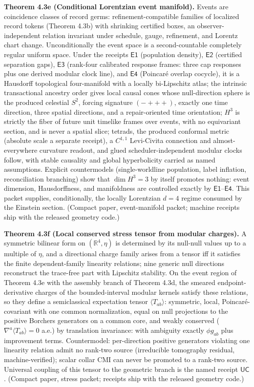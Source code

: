 \textbf{Theorem 4.3e (Conditional Lorentzian event manifold).} Events are coincidence classes of record germs: refinement-compatible families of localized record tokens (Theorem 4.3b) with shrinking certified boxes, an observer-independent relation invariant under schedule, gauge, refinement, and Lorentz chart change. Unconditionally the event space is a second-countable completely regular uniform space. Under the receipts \(\mathsf{E1}\) (population density), \(\mathsf{E2}\) (certified separation gaps), \(\mathsf{E3}\) (rank-four calibrated response frames: three cap responses plus one derived modular clock line), and \(\mathsf{E4}\) (Poincar\'e overlap cocycle), it is a Hausdorff topological four-manifold with a locally bi-Lipschitz atlas; the intrinsic transactional ancestry order gives local causal cones whose null-direction sphere is the produced celestial \(S^2\), forcing signature \((-{+}{+}{+})\), exactly one time direction, three spatial directions, and a repair-oriented time orientation; \(H^3\) is strictly the fiber of future unit timelike frames over events, with no equivariant section, and is never a spatial slice; tetrads, the produced conformal metric (absolute scale a separate receipt), a \(C^{1,1}\) Levi-Civita connection and almost-everywhere curvature readout, and glued scheduler-independent modular clocks follow, with stable causality and global hyperbolicity carried as named assumptions. Explicit countermodels (single-worldline population, label inflation, reconciliation branching) show that \(\dim H^3=3\) by itself promotes nothing: event dimension, Hausdorffness, and manifoldness are controlled exactly by \(\mathsf{E1}\)--\(\mathsf{E4}\). This packet supplies, conditionally, the locally Lorentzian \(d=4\) regime consumed by the Einstein section. (Compact paper, event-manifold packet; machine receipts ship with the released geometry code.)


\textbf{Theorem 4.3f (Local conserved stress tensor from modular charges).} A symmetric bilinear form on \((\mathbb R^4,\eta)\) is determined by its null-null values up to a multiple of \(\eta\), and a directional charge family arises from a tensor iff it satisfies the finite dependent-family linearity relations; nine generic null directions reconstruct the trace-free part with Lipschitz stability. On the event region of Theorem 4.3e with the assembly branch of Theorem 4.3d, the smeared endpoint-derivative charges of the bounded-interval modular kernels satisfy these relations, so they define a semiclassical expectation tensor \(\langle T_{ab}\rangle\): symmetric, local, Poincar\'e-covariant with one common normalization, equal on null projections to the positive Borchers generators on a common core, and weakly conserved (\(\nabla^a\langle T_{ab}\rangle=0\) a.e.) by translation invariance: with ambiguity exactly \(\phi g_{ab}\) plus improvement terms. Countermodel: per-direction positive generators violating one linearity relation admit no rank-two source (irreducible tomography residual, machine-verified); scalar collar CMI can never be promoted to a rank-two source. Universal coupling of this tensor to the geometric branch is the named receipt \(\mathsf{UC}\). (Compact paper, stress packet; receipts ship with the released geometry code.)

